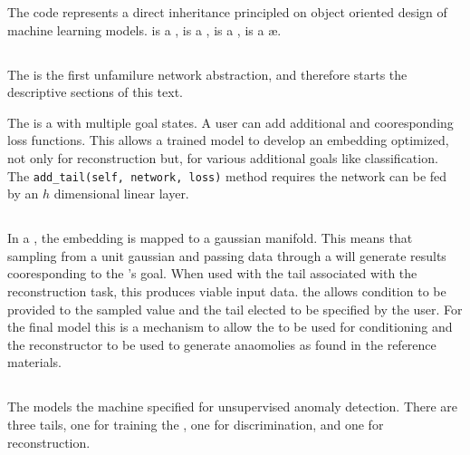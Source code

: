 \documentclass{article}
\begin{document}
\begin{multicols}{2}
The code represents a direct inheritance principled on object oriented design of machine
learning models. \desc is a \condgen, is a \gumiho, is a \vae, is a \ae.

\subsection{\gumiho}

The \gumiho is the first unfamilure network abstraction, and therefore starts the descriptive
sections of this text.

The \gumiho is a \vae with multiple goal states. A user can add additional 
and cooresponding loss functions. This allows a trained model to develop an embedding
optimized, not only for reconstruction but, for various additional goals like classification.
The \texttt{add\_tail(self, network, loss)} method requires the network can be fed by an $h$
dimensional linear layer.




\subsection{\condgen}

In a \vae, the embedding is mapped to a gaussian manifold. This means that sampling from
a unit gaussian and passing data through a \decoder will generate results cooresponding to the
\decoder's goal. When used with the tail associated with the reconstruction task, this produces
viable input data. the \condgen allows condition to be provided to the sampled value and the
tail elected to be specified by the user. For the final model this is a mechanism to allow the
\GMM to be used for conditioning and the reconstructor to be used to generate anaomolies
as found in the reference materials.



\subsection{\desc}

The \desc models the machine specified\cite{1810.09133} for unsupervised anomaly detection.
There are three tails, one for training the \GMM, one for discrimination, and one for
reconstruction.




\end{multicols}
\end{document}
